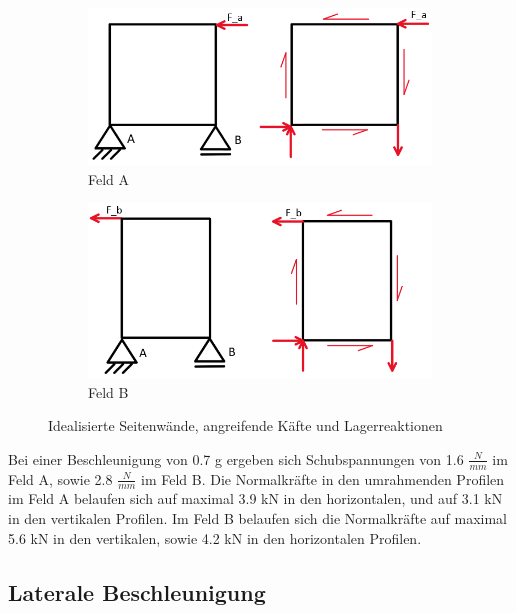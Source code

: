   \begin{figure}[!ht]
    \centering
      \begin{subfigure}[b]{0.5\textwidth}
         \includegraphics[width=1\linewidth]{04_Figures/1.2 Feld A}
         \caption{Feld A}
         \label{Feld A}
      \end{subfigure}
      \begin{subfigure}[b]{0.5\textwidth}
         \includegraphics[width=1\linewidth]{04_Figures/1.2 Feld B}
         \caption{Feld B}
         \label{Feld B}
      \end{subfigure}
    \caption{Idealisierte Seitenwände, angreifende Käfte und Lagerreaktionen}
    \label{1.2 Felder}
  \end{figure}

  Bei einer Beschleunigung von 0.7 g ergeben sich Schubspannungen von 1.6 $\frac{N}{mm}$ im Feld A, sowie 2.8 $\frac{N}{mm}$ im Feld B. Die Normalkräfte in den umrahmenden Profilen im Feld A belaufen sich auf maximal 3.9 kN in den horizontalen, und auf 3.1 kN in den vertikalen Profilen. Im Feld B belaufen sich die Normalkräfte auf maximal 5.6 kN in den vertikalen, sowie 4.2 kN in den horizontalen Profilen.

\subsection{Laterale Beschleunigung}
